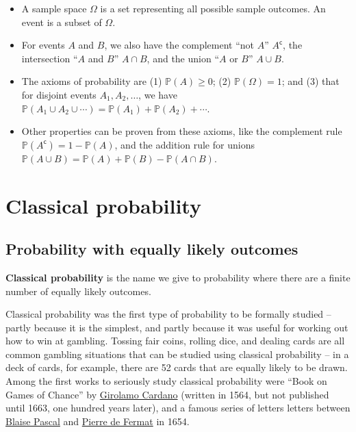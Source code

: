 \documentclass[
  a4paper,
]{book}
\providecommand{\tightlist}{%
  \setlength{\itemsep}{0pt}\setlength{\parskip}{0pt}}
\theoremstyle{definition}
\theoremstyle{definition}
\theoremstyle{definition}
\theoremstyle{definition}
\theoremstyle{remark}
\begin{document}
\begin{itemize}
\tightlist
\item
  A sample space \(\Omega\) is a set representing all possible sample outcomes. An event is a subset of \(\Omega\).
\item
  For events \(A\) and \(B\), we also have the complement ``not \(A\)'' \(A^\mathsf{c}\), the intersection ``\(A\) and \(B\)'' \(A \cap B\), and the union ``\(A\) or \(B\)'' \(A \cup B\).
\item
  The axioms of probability are (1) \(\mathbb P(A) \geq 0\); (2) \(\mathbb P(\Omega) = 1\); and (3) that for disjoint events \(A_1, A_2, \dots\), we have \(\mathbb P(A_1 \cup A_2 \cup \cdots) = \mathbb P(A_1) + \mathbb P(A_2) + \cdots\).
\item
  Other properties can be proven from these axioms, like the complement rule \(\mathbb P(A^\mathsf{c}) = 1 - \mathbb P(A)\), and the addition rule for unions \(\mathbb P(A \cup B) = \mathbb P(A) + \mathbb P(B) - \mathbb P(A \cap B)\).
\end{itemize}

\hypertarget{S03-classical}{%
\chapter{Classical probability}\label{S03-classical}}

\newcommand{\ff}[2]{{#1}^{\underline{#2}}}

\hypertarget{classical-intro}{%
\section{Probability with equally likely outcomes}\label{classical-intro}}

\textbf{Classical probability} is the name we give to probability where there are a finite number of equally likely outcomes.

Classical probability was the first type of probability to be formally studied -- partly because it is the simplest, and partly because it was useful for working out how to win at gambling. Tossing fair coins, rolling dice, and dealing cards are all common gambling situations that can be studied using classical probability -- in a deck of cards, for example, there are 52 cards that are equally likely to be drawn. Among the first works to seriously study classical probability were ``Book on Games of Chance'' by \href{https://mathshistory.st-andrews.ac.uk/Biographies/Cardan/}{Girolamo Cardano} (written in 1564, but not published until 1663, one hundred years later), and a famous series of letters letters between \href{https://mathshistory.st-andrews.ac.uk/Biographies/Pascal/}{Blaise Pascal} and \href{https://mathshistory.st-andrews.ac.uk/Biographies/Fermat/}{Pierre de Fermat} in 1654.
\end{document}
